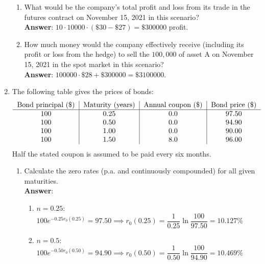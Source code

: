 \documentclass{article}
\begin{document}
\begin{enumerate}
            \begin{enumerate}[resume]
                  \item What would be the company's total profit and loss from its trade in the futures contract on November 15, 2021 in this scenario?\\
                        \textbf{Answer}: $10\cdot 10000\cdot (\$30-\$27)=\$300000$ profit.
                  \item How much money would the company effectively receive (including its profit or loss from the hedge) to sell the $100,000$ of asset A on November 15, 2021 in the spot market in this scenario?\\
                        \textbf{Answer}: $100000\cdot\$28+\$300000=\$3100000$.
            \end{enumerate}
            \newpage
      \item The following table gives the prices of bonds:
            \[\begin{tabular}{c|c|c|c}
                        Bond principal (\$) & Maturity (years) & Annual coupon (\$) & Bond price (\$) \\
                        \hline
                        100                 & 0.25             & 0.0                & 97.50           \\
                        100                 & 0.50             & 0.0                & 94.90           \\
                        100                 & 1.00             & 0.0                & 90.00           \\
                        100                 & 1.50             & 8.0                & 96.00
                  \end{tabular}\]
            Half the stated coupon is assumed to be paid every six months.
            \begin{enumerate}
                  \item Calculate the zero rates (p.a. and continuously compounded) for all given maturities.\\
                        \textbf{Answer}:
                        \begin{enumerate}
                              \item $n=0.25$: $100e^{-0.25r_0(0.25)}=97.50\implies r_0(0.25)=\dfrac{1}{0.25}\ln\dfrac{100}{97.50}=10.127\%$
                              \item $n=0.5$: $100e^{-0.50r_0(0.50)}=94.90\implies r_0(0.50)=\dfrac{1}{0.50}\ln\dfrac{100}{94.90}=10.469\%$

\end{enumerate}
\end{enumerate}
\end{enumerate}
\end{document}
